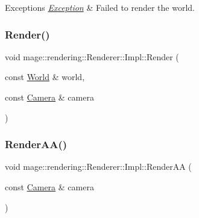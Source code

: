 \begin{DoxyExceptions}{Exceptions}
{\em \hyperlink{classmage_1_1_exception}{Exception}} & Failed to render the world. \\
\hline
\end{DoxyExceptions}
\hypertarget{classmage_1_1rendering_1_1_renderer_1_1_impl_af2d46a795175867592dc70e63c93967b}{}\label{classmage_1_1rendering_1_1_renderer_1_1_impl_af2d46a795175867592dc70e63c93967b} 
\subsubsection{\texorpdfstring{Render()}{Render()}\hspace{0.1cm}{\footnotesize\ttfamily [2/2]}}
{\footnotesize\ttfamily void mage\+::rendering\+::\+Renderer\+::\+Impl\+::\+Render (\begin{DoxyParamCaption}\item[{const \hyperlink{classmage_1_1rendering_1_1_world}{World} \&}]{world,  }\item[{const \hyperlink{classmage_1_1rendering_1_1_camera}{Camera} \&}]{camera }\end{DoxyParamCaption})\hspace{0.3cm}{\ttfamily [private]}}

\hypertarget{classmage_1_1rendering_1_1_renderer_1_1_impl_a6fffbc6a0de26d1a41a94998cdb98f20}{}\label{classmage_1_1rendering_1_1_renderer_1_1_impl_a6fffbc6a0de26d1a41a94998cdb98f20} 
\subsubsection{\texorpdfstring{Render\+A\+A()}{RenderAA()}}
{\footnotesize\ttfamily void mage\+::rendering\+::\+Renderer\+::\+Impl\+::\+Render\+AA (\begin{DoxyParamCaption}\item[{const \hyperlink{classmage_1_1rendering_1_1_camera}{Camera} \&}]{camera }\end{DoxyParamCaption})\hspace{0.3cm}{\ttfamily [private]}}

